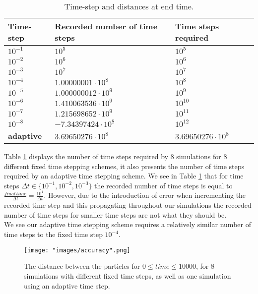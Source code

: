 \documentclass[12pt, a4paper]{article}
\begin{document}
\begin{longtable}{|p{3cm}|p{7cm}|p{4.5cm}|}
\caption{Time-step and distances at end time.}\\
\hline
\label{tab:one}
\bf{Time-step} & \bf{Recorded number  of time steps} &\bf{Time steps required}\\ \hline
$10^{-1}$ & $10^5$& $10^5$\\ \hline
$10^{-2}$ & $10^6$&$10^6$\\ \hline
$10^{-3}$ & $10^7$&$10^7$\\ \hline
$10^{-4}$ & $1.00000001 \cdot 10^{8}$ & $10^8$\\ \hline
$10^{-5}$ & $1.000000012 \cdot 10^{9}$ & $10^9$\\ \hline
$10^{-6}$ & $1.410063536 \cdot 10^{9}$ & $10^{10}$\\ \hline
$10^{-7}$ & $1.215698652 \cdot 10^{9}$ & $10^{11}$\\ \hline
$10^{-8}$ & $-7.34397424 \cdot 10^{8}$ & $10^{12}$\\ \hline
\textbf{adaptive} & $3.69650276\cdot 10^8$ & $3.69650276 \cdot 10^8$\\ \hline
\end{longtable}
Table \ref{tab:one} displays the number of time steps required by 8 simulations for 8 different fixed time stepping schemes, it also presents the number of time steps required by an adaptive time stepping scheme. We see in Table \ref{tab:one} that for time steps $\Delta t \in \{10^{-1}, 10^{-2}, 10^{-3}\}$ the recorded number of time steps is equal to $\frac{final \, time}{\Delta t} = \frac{10^4}{\Delta t}$. However, due to the introduction of error when incrementing the recorded time step and this propagating throughout our simulations the recorded number of time steps for smaller time steps are not what they should be.\\ We see our adaptive time stepping scheme requires a relatively similar number of time steps to the fixed time step $10^{-4}$.\\
\begin{wrapfigure}{h}{0.65\textwidth}
\texttt{[image: "images/accuracy".png]}
\caption{The distance between the particles for $0 \leq time \leq 10000$, for $8$ simulations with different fixed time steps, as well as one simulation using an adaptive time step.}
\label{fig:one}
\end{wrapfigure}
\end{document}
